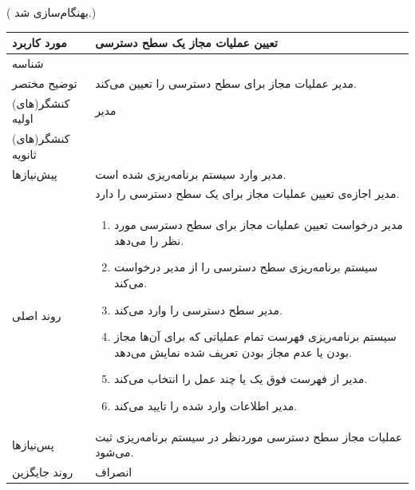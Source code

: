 ({\color{red} بهنگام‌سازی شد.})
\begin{table}[H]
	\centering
	\begin{tabular}{|p{3cm}|p{10cm}|}
		\hline
		مورد کاربرد & تعیین عملیات مجاز یک سطح دسترسی  \\
		\hline
		شناسه & 
		\stepcounter{usecase_ID}
		\arabic{usecase_ID} \\
		\hline
		توضیح مختصر & مدیر عملیات مجاز برای سطح دسترسی را تعیین می‌کند. \\
		\hline
		کنشگر(های) اولیه & مدیر \\
		\hline
		کنشگر(های) ثانویه &  \\
		\hline
		پیش‌نیازها & مدیر وارد سیستم برنامه‌ریزی شده است. \\
		& مدیر اجازه‌ی تعیین عملیات مجاز برای یک سطح دسترسی را دارد.\\
		\hline
		
		روند اصلی &
		\begin{enumerate}[topsep=0cm,leftmargin=0.5cm]
			\item مدیر درخواست تعیین عملیات مجاز برای سطح دسترسی مورد نظر را می‌دهد.
			\item سیستم برنامه‌ریزی سطح دسترسی را از مدیر درخواست می‌کند.
			\item مدیر سطح دسترسی را وارد می‌کند.
			\item سیستم برنامه‌ریزی فهرست تمام عملیاتی که برای آن‌ها مجاز بودن یا عدم مجاز بودن تعریف شده نمایش می‌دهد.
			\item مدیر از فهرست فوق یک یا چند عمل را انتخاب می‌کند.
			\item مدیر اطلاعات وارد شده را تایید می‌کند.
		\end{enumerate} \\
		
		\hline
		پس‌نیازها & عملیات مجاز سطح دسترسی موردنظر در سیستم برنامه‌ریزی  ثبت می‌شود. \\
		\hline
		روند جایگزین & انصراف \\
		\hline
	\end{tabular}
\end{table}


